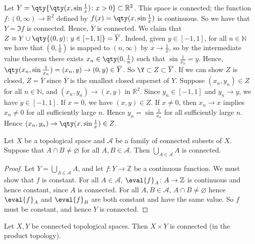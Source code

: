 \begin{example}
	Let \( Y = \qty{\qty(x, \sin\frac{1}{x}) \colon x > 0} \subset \mathbb R^2 \).
	This space is connected; the function \( f \colon (0, \infty) \to \mathbb R^2 \) defined by \( f(x) = \qty(x,\sin \frac{1}{x}) \) is continuous.
	So we have that \( Y = \Im f \) is connected.
	Hence, \( \overline Y \) is connected.
	We claim that \( Z \equiv Y \cup \qty{(0,y) \colon y \in [-1,1]} = \overline Y \).
	Indeed, given \( y \in [-1,1] \), for all \( n \in \mathbb N \) we have that \( (0, \frac{1}{n}) \) is mapped to \( (n,\infty) \) by \( x \to \frac{1}{x} \), so by the intermediate value theorem there exists \( x_n \in \qty(0, \frac{1}{n}) \) such that \( \sin \frac{1}{x_n} = y \).
	Hence, \( \qty(x_n, \sin \frac{1}{x_n}) = (x_n, y) \to (0,y) \in \overline Y \).
	So \( \Y \subset Z \subset \overline Y \).
	If we can show \( Z \) is closed, \( Z = \overline Y \) since \( \overline Y \) is the smallest closed superset of \( Y \).
	Suppose \( (x_n, y_n) \in Z \) for all \( n \in \mathbb N \), and \( (x_n, y_n) \to (x,y) \) in \( \mathbb R^2 \).
	Since \( y_n \in [-1,1] \) and \( y_n \to y \), we have \( y \in [-1,1] \).
	If \( x = 0 \), we have \( (x,y) \in Z \).
	If \( x \neq 0 \), then \( x_n \to x \) implies \( x_n \neq 0 \) for all sufficiently large \( n \).
	Hence \( y_n = \sin \frac{1}{x_n} \) for all sufficiently large \( n \).
	Hence \( (x_n, y_n) \to \qty(x, \sin \frac{1}{x}) \in Z \).
\end{example}
\begin{lemma}
	Let \( X \) be a topological space and \( \mathcal A \) be a family of connected subsets of \( X \).
	Suppose that \( A \cap B \neq \varnothing \) for all \( A, B \in \mathcal A \).
	Then \( \bigcup_{A \in \mathcal A} A \) is connected.
\end{lemma}
\begin{proof}
	Let \( Y = \bigcup_{A \in \mathcal A} A \), and let \( f \colon Y \to \mathbb Z \) be a continuous function.
	We must show that \( f \) is constant.
	For all \( A \in \mathcal A \), \( \eval{f}_A \colon A \to \mathbb Z \) is continuous and hence constant, since \( A \) is connected.
	For all \( A, B \in \mathcal A \), \( A \cap B \neq \varnothing \) hence \( \eval{f}_A \) and \( \eval{f}_B \) are both constant and have the same value.
	So \( f \) must be constant, and hence \( Y \) is connected.
\end{proof}
\begin{theorem}
	Let \( X, Y \) be connected topological spaces.
	Then \( X \times Y \) is connected (in the product topology).
\end{theorem}
